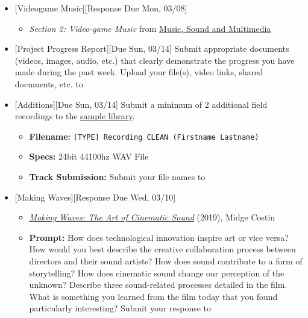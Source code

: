 \def\dMon{Mon, 03/08}
\def\dTues{Tues, 03/09}
\def\dWed{Wed, 03/10}
\def\dThur{Thur, 03/11}
\def\dFri{Fri, 03/12}
\def\dSat{Sat, 03/13}
\def\dSun{Sun, 03/14}
\placeDate

\begin{itemize}[noitemsep,topsep=0pt,leftmargin=*]
	\item {}[Videogame Music][Response Due \dMon]
	      \begin{itemize}
		      \item \emph{Section 2: Video-game Music} from \href{supplements/Music_Sound_and_Multimedia_-_From_the_Live_to_the_Virtual_(Music_and_the_Moving_Image)_(2008).pdf}{Music, Sound and Multimedia}
	      \end{itemize}

	\item {}[Project Progress Report][Due \dSun] \newline
	      Submit appropriate documents (videos, images, audio, etc.) that clearly demonstrate the progress you have made during the past week. Upload your file(s), video links, shared documents, etc. to \discordE
	\item {}[Additions][Due \dSun] \newline
	      Submit a minimum of 2 additional field recordings to the \href{\samplelibPermURL}{sample library}.
	      \begin{itemize}
		      \item \textbf{Filename:} \texttt{[TYPE] Recording CLEAN (Firstname Lastname)}
		      \item \textbf{Specs:} 24bit 44100hz WAV File
		      \item \textbf{Track Submission:} Submit your file names to \discordS
	      \end{itemize}
	\item {}[Making Waves][Response Due \dWed]
	      \begin{itemize}
		      \item \href{https://www.youtube.com/watch?v=xsckp8r1-8c}{\emph{Making Waves: The Art of Cinematic Sound}} (2019), Midge Costin
		      \item \textbf{Prompt:} How does technological innovation inspire art or vice versa? How would you best describe the creative collaboration process between directors and their sound artists? How does sound contribute to a form of storytelling? How does cinematic sound change our perception of the unknown? Describe three sound-related processes detailed in the film. What is something you learned from the film today that you found particularly interesting? Submit your response to 
	      \end{itemize}
\end{itemize}